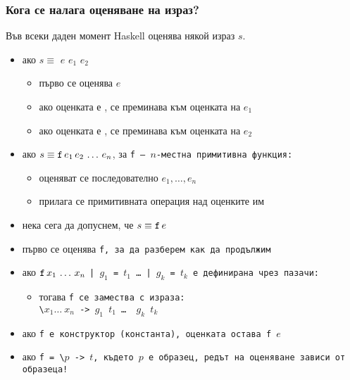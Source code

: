 \documentclass[alsotrans,beameroptions={aspectratio=169}]{beamerswitch}
\begin{document}
\begin{frame}
  \frametitle{Кога се налага оценяване на израз?}

  Във всеки даден момент Haskell оценява някой израз $s$. \pause
  \begin{itemize}[<+->]
  \item ако $s \equiv$  $e$  $e_1$  $e_2$
    \begin{itemize}
    \item първо се оценява $e$
    \item ако оценката е , се преминава към оценката на $e_1$
    \item ако оценката е , се преминава към оценката на $e_2$
    \end{itemize}
  \item ако $s \equiv \tt f\,e_1\,e_2\,\ldots\,e_n$, за \tt f --- $n$-местна примитивна функция:
    \begin{itemize}
    \item оценяват се последователно $e_1,\ldots,e_n$
    \item прилага се примитивната операция над оценките им
    \end{itemize}
  \item нека сега да допуснем, че $s \equiv \tt f\,e$
  \item първо се оценява \tt f, за да разберем как да продължим
  \item ако $\tt f\,x_1\,\ldots\,x_n$ \tt| $g_1$ \tt= $t_1$ \ldots\ \tt| $g_k$ \tt= $t_k$ е дефинирана чрез пазачи:
    \begin{itemize}
    \item тогава \tt f се замества с израза:\\
      \tt{\textbackslash $x_1 \ldots\ x_n$ ->}  $g_1$  $t_1$  \ldots\  $g_k$  $t_k$ 
    \end{itemize}
  \item ако \tt f е конструктор (константа), \alert{оценката остава \tt f $e$}
  \item ако \tt{f = \textbackslash $p$ -> $t$}, където $p$ е образец, редът на оценяване зависи от образеца!
  \end{itemize}
\end{frame}
\end{document}
